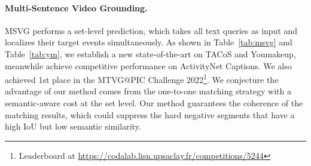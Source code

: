 \begin{table}[]
{\begin{tabular}{l|ccc|ccc}
\bottomrule
\end{tabular}}
\label{tab:ssvg}
\vspace{-1.0em}
\end{table}


\vspace{-1.0em}
\paragraph{\textbf{Multi-Sentence Video Grounding.}}
MSVG performs a set-level prediction, which takes all text queries as input and localizes their target events simultaneously. 
As shown in Table~\ref{tab:msvg} and Table~\ref{tab:ym}, 
we establish a new state-of-the-art on TACoS and Youmakeup, meanwhile achieve competitive performance on ActivityNet Captions. We also achieved 1st place in the MTVG@PIC Challenge 2022\footnote{Leaderboard at \url{https://codalab.lisn.upsaclay.fr/competitions/5244}}. We conjecture the advantage of our method comes from 
the one-to-one matching strategy with a semantic-aware cost at the set level. Our method guarantees the coherence of the matching results, which could suppress the hard negative segments that have a high IoU but low semantic similarity.

\begin{table}[]
\caption{Multi-sentence video grounding performance on ActivityNet Captions and TACoS. All methods are based on C3D features without special indication.}
\vspace{-0.5em}
\renewcommand\arraystretch{0.9}
\centering
\small
        \makeatletter{}\makeatother
\label{tab:msvg}
\vspace{-0.2em}
\end{table}
 

